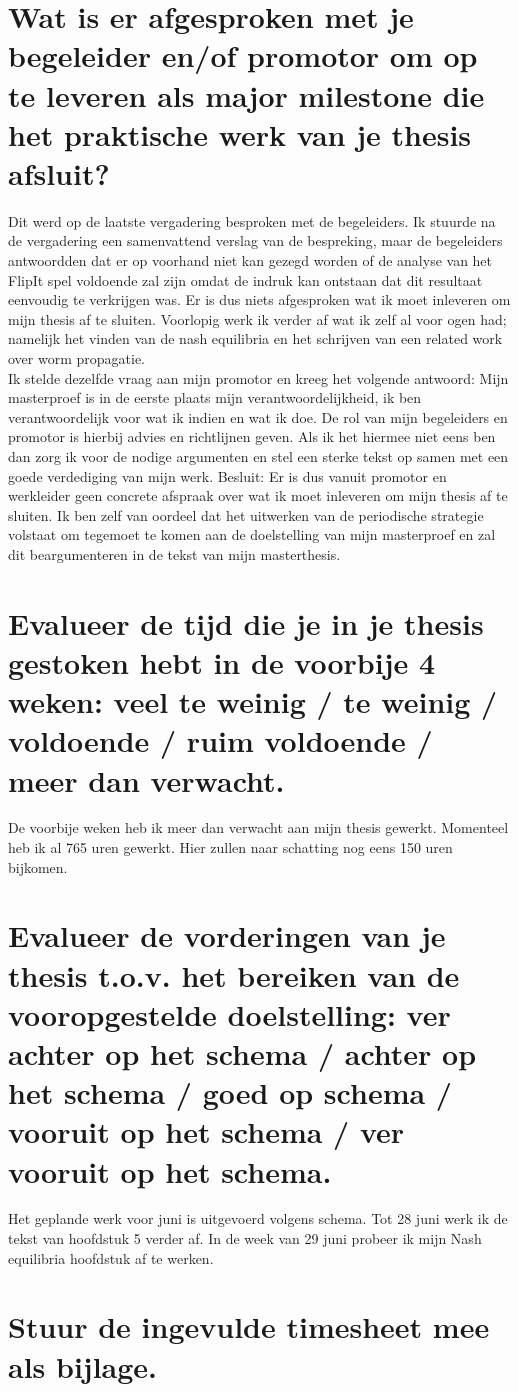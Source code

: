 \documentclass[a4paper, 11pt]{article}
\begin{document}
\section{Wat is er afgesproken met je begeleider en/of promotor om op te leveren als major milestone die het praktische werk van je thesis afsluit?}
Dit werd op de laatste vergadering besproken met de begeleiders. Ik stuurde na de vergadering een samenvattend verslag van de bespreking, maar de begeleiders antwoordden dat er op voorhand niet kan gezegd worden of de analyse van het FlipIt spel voldoende zal zijn omdat de indruk kan ontstaan dat dit resultaat eenvoudig te verkrijgen was. Er is dus niets afgesproken wat ik moet inleveren om mijn thesis af te sluiten.
Voorlopig werk ik verder af wat ik zelf al voor ogen had; namelijk het vinden van de nash equilibria en het schrijven van een related work over worm propagatie. \\
Ik stelde dezelfde vraag aan mijn promotor en kreeg het volgende antwoord: Mijn masterproef is in de eerste plaats mijn verantwoordelijkheid, ik ben verantwoordelijk voor wat ik indien en wat ik doe. De rol van mijn begeleiders en promotor is hierbij advies en richtlijnen geven.
Als ik het hiermee niet eens ben dan zorg ik voor de nodige argumenten en stel een sterke tekst op samen met een goede verdediging van mijn werk. 
Besluit: Er is dus vanuit promotor en werkleider geen concrete afspraak over wat ik moet inleveren om mijn thesis af te sluiten. Ik ben zelf van oordeel dat het uitwerken van de periodische strategie volstaat om tegemoet te komen aan de doelstelling van mijn masterproef en zal dit beargumenteren in de tekst van mijn masterthesis. 
\section{Evalueer de tijd die je in je thesis gestoken hebt in de voorbije 4 weken: veel te weinig / te weinig / voldoende / ruim voldoende / meer dan verwacht.}
De voorbije weken heb ik meer dan verwacht aan mijn thesis gewerkt. Momenteel heb  ik al 765 uren gewerkt. Hier zullen naar schatting nog eens 150 uren bijkomen. 
\section{Evalueer de vorderingen van je thesis t.o.v. het bereiken van de vooropgestelde doelstelling: ver achter op het schema / achter op het schema / goed op schema / vooruit op het schema / ver vooruit op het schema.}
Het geplande werk voor juni is uitgevoerd volgens schema. Tot 28 juni werk ik de tekst van hoofdstuk 5 verder af. In de week van 29 juni probeer ik mijn Nash equilibria hoofdstuk af te werken. 
\section{Stuur de ingevulde timesheet mee als bijlage.}
\end{document}
